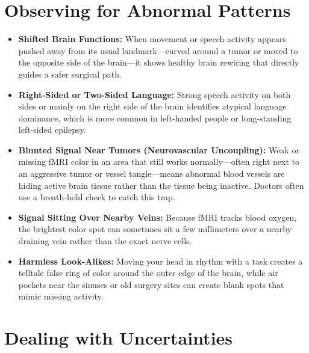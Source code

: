\section{Observing for Abnormal Patterns}

\begin{itemize}
    \item \textbf{Shifted Brain Functions:} When movement or speech activity appears pushed away from its usual landmark---curved around a tumor or moved to the opposite side of the brain---it shows healthy brain rewiring that directly guides a safer surgical path.
    \item \textbf{Right-Sided or Two-Sided Language:} Strong speech activity on both sides or mainly on the right side of the brain identifies atypical language dominance, which is more common in left-handed people or long-standing left-sided epilepsy.
    \item \textbf{Blunted Signal Near Tumors (Neurovascular Uncoupling):} Weak or missing fMRI color in an area that still works normally---often right next to an aggressive tumor or vessel tangle---means abnormal blood vessels are hiding active brain tissue rather than the tissue being inactive. Doctors often use a breath-hold check to catch this trap.
    \item \textbf{Signal Sitting Over Nearby Veins:} Because fMRI tracks blood oxygen, the brightest color spot can sometimes sit a few millimeters over a nearby draining vein rather than the exact nerve cells.
    \item \textbf{Harmless Look-Alikes:} Moving your head in rhythm with a task creates a telltale false ring of color around the outer edge of the brain, while air pockets near the sinuses or old surgery sites can create blank spots that mimic missing activity.
\end{itemize}

\section{Dealing with Uncertainties}

